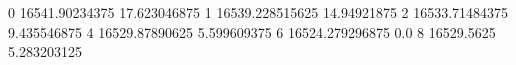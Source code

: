 0 16541.90234375 17.623046875
1 16539.228515625 14.94921875
2 16533.71484375 9.435546875
4 16529.87890625 5.599609375
6 16524.279296875 0.0
8 16529.5625 5.283203125
